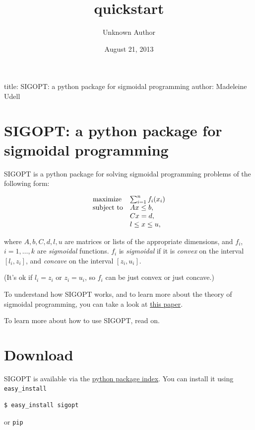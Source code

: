 \documentclass[letterpaper,10pt,english]{/Users/madeleineudell/anaconda/lib/python2.7/site-packages/sphinx/texinputs/sphinxhowto}
\title{quickstart}
\date{August 21, 2013}
\author{Unknown Author}
\begin{document}
        
            \maketitle
        

        


        
        title: SIGOPT: a python package for sigmoidal programming author:
Madeleine Udell

\section{SIGOPT: a python package for sigmoidal programming}

SIGOPT is a python package for solving sigmoidal programming problems of
the following form:

\[
\begin{array}{ll} 
\mbox{\textrm{maximize}} & \sum_{i=1}^n f_i(x_i) \\ 
\mbox{subject to} & Ax \leq b, \\
& Cx = d, \\
& l \leq x \leq u,
\end{array}
\]

where $A,b,C,d,l,u$ are matrices or lists of the appropriate dimensions,
and $f_i$, $i=1,\ldots,k$ are \emph{sigmoidal} functions. $f_i$ is
\emph{sigmoidal} if it is \emph{convex} on the interval $[l_i,z_i]$, and
\emph{concave} on the interval $[z_i,u_i]$.

(It's ok if $l_i=z_i$ or $z_i=u_i$, so $f_i$ can be just convex or just
concave.)

To understand how SIGOPT works, and to learn more about the theory of
sigmoidal programming, you can take a look at
\href{www.stanford.edu/~udell/doc/max_sum_sigmoids.pdf}{this paper}.

To learn more about how to use SIGOPT, read on.\section{Download}

SIGOPT is available via the
\href{https://pypi.python.org/pypi?\%3Aaction=search\&term=sigopt\&submit=search}{python
package index}. You can install it using \texttt{easy\_install}

\begin{verbatim}
$ easy_install sigopt
\end{verbatim}

or \texttt{pip}
\end{document}
